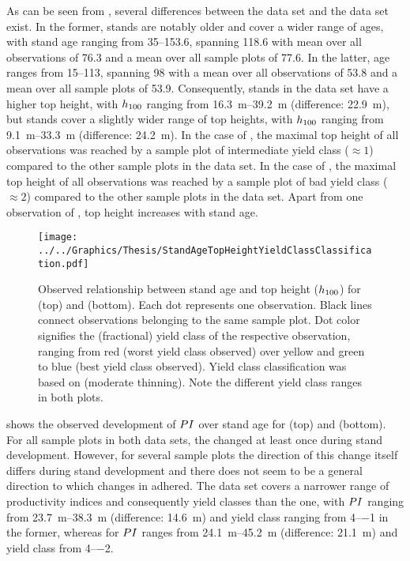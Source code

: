 As can be seen from , several differences between the \Beech{} data set and the \Spruce{} data set exist.  In the former, stands are notably older and cover a wider range of ages, with stand age ranging from \SIrange{35}{153.6}{\year}, spanning \SI{118.6}{\year} with mean over all observations of \SI{76.3}{\year} and a mean over all sample plots of \SI{77.6}{\year}.  In the latter, age ranges from \SIrange{15}{113}{\year}, spanning \SI{98}{\year} with a mean over all observations of \SI{53.8}{\year} and a mean over all sample plots of \SI{53.9}{\year}.  Consequently, stands in the \Beech{} data set have a higher top height, with \(h_{100}{}\) ranging from \SIrange{16.3}{39.2}{\meter} (difference: \SI{22.9}{\meter}), but \Spruce{} stands cover a slightly wider range of top heights, with \(h_{100}{}\) ranging from \SIrange{9.1}{33.3}{\meter} (difference: \SI{24.2}{\meter}).   In the case of \Beech{}, the maximal top height of all observations was reached by a sample plot of intermediate yield class (\(\approx{} 1\)) compared to the other sample plots in the data set.   In the case of \Spruce{}, the maximal top height of all observations was reached by a sample plot of bad yield class (\(\approx{} 2\)) compared to the other sample plots in the data set.  Apart from one observation of \Beech{}, top height increases with stand age.

\begin{figure}[t]
  \texttt{[image: ../../Graphics/Thesis/StandAgeTopHeightYieldClassClassification.pdf]}
  \caption{Observed relationship between stand age and top height (\(h_{100}{}\)) for \Beech{} (top) and \Spruce{} (bottom).  Each dot represents one observation.  Black lines connect observations belonging to the same sample plot.  Dot color signifies the (fractional) yield class of the respective observation, ranging from red (worst yield class observed) over yellow and green to blue (best yield class observed).  Yield class classification was based on \textcite{Schober1995} (moderate thinning).  Note the different yield class ranges in both plots.}
  \label{fig:StandAgeTopHeightYieldClassClassification}
\end{figure}

 shows the observed development of \ProductivityIndexText{} \(PI{}\) over stand age for \Beech{} (top) and \Spruce{} (bottom).  For all sample plots in both data sets, the \ProductivityIndexText{} changed at least once during stand development.  However, for several sample plots the direction of this change itself differs during stand development and there does not seem to be a general direction to which changes in \ProductivityIndexText{} adhered.  The \Beech{} data set covers a narrower range of productivity indices and consequently yield classes than the \Spruce{} one, with \(PI{}\) ranging from \SIrange{23.7}{38.3}{\meter} (difference: \SI{14.6}{\meter}) and yield class ranging from \numrange{4}{-1} in the former, whereas for \Spruce{} \(PI{}\) ranges from \SIrange{24.1}{45.2}{\meter} (difference: \SI{21.1}{\meter}) and yield class from \numrange{4}{-2}.

